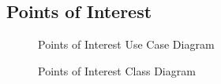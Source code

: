 \documentclass[11pt]{article}
\begin{document}
	\subsection{Points of Interest}
	\begin{figure}[!h]
        \centering
        \caption{Points of Interest Use Case Diagram}
        \label{fig:poi_use_case}
    \end{figure}
    \begin{figure}[!h]
        \centering
        \caption{Points of Interest Class Diagram}
        \label{fig:poi_class}
    \end{figure}
\end{document}
